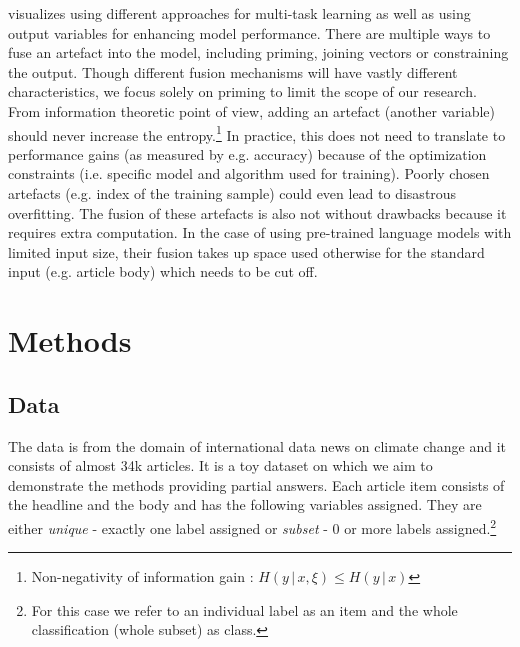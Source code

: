  visualizes using different approaches for multi-task learning as well as using output variables for enhancing model performance.
% 
There are multiple ways to fuse an artefact into the model, including priming, joining vectors or constraining the output.
Though different fusion mechanisms will have vastly different characteristics, we focus solely on priming to limit the scope of our research.
% 
From information theoretic point of view, adding an artefact (another variable) should never increase the entropy.\footnote{Non-negativity of information gain \cite{cover1991elements}: $H(y\,|\,x,\xi) \le H(y\,|\,x)$}
In practice, this does not need to translate to performance gains (as measured by e.g. accuracy) because of the optimization constraints (i.e. specific model and algorithm used for training).
Poorly chosen artefacts (e.g. index of the training sample) could even lead to disastrous overfitting.
The fusion of these artefacts is also not without drawbacks because it requires extra computation.
In the case of using pre-trained language models with limited input size, their fusion takes up space used otherwise for the standard input (e.g. article body) which needs to be cut off.

\section{Methods} \label{sec:methods}

\subsection{Data} \label{subsec:data}

The data is from the domain of international data news on climate change and it consists of almost 34k articles.
It is a toy dataset on which we aim to demonstrate the methods providing partial answers.
Each article item consists of the headline and the body and has the following variables assigned.
They are either \textit{unique} - exactly one label assigned or \textit{subset} - 0 or more labels assigned.\footnote{For this case we refer to an individual label as an item and the whole classification (whole subset) as class.}

